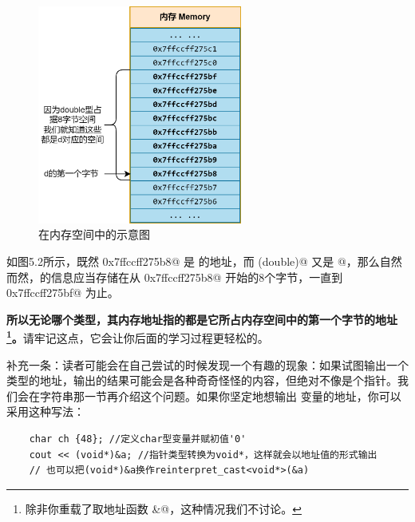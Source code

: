 \begin{figure}[htbp]
    \centering
    \includegraphics[width=0.6\textwidth]{../images/generalized_parts/05_address_of_types_in_memory.drawio.png}
    \caption{\lstinline@d@ 在内存空间中的示意图}
\end{figure}
如图5.2所示，既然 \lstinline@0x7ffccff275b8@ 是 \lstinline@d@ 的地址，而 \lstinline@sizeof(double)@ 又是 @，那么自然而然，\lstinline@d@ 的信息应当存储在从 \lstinline@0x7ffccff275b8@ 开始的8个字节，一直到 \lstinline@0x7ffccff275bf@ 为止。\par
\textbf{所以无论哪个类型，其内存地址指的都是它所占内存空间中的第一个字节的地址\footnote{除非你重载了取地址函数 \lstinline@&@，这种情况我们不讨论。}。}请牢记这点，它会让你后面的学习过程更轻松的。\par
补充一条：读者可能会在自己尝试的时候发现一个有趣的现象：如果试图输出一个 \lstinline@char@ 类型的地址，输出的结果可能会是各种奇奇怪怪的内容，但绝对不像是个指针。我们会在字符串那一节再介绍这个问题。如果你坚定地想输出 \lstinline@char@ 变量的地址，你可以采用这种写法：
\begin{lstlisting}
    char ch {48}; //定义char型变量并赋初值'0'
    cout << (void*)&a; //指针类型转换为void*，这样就会以地址值的形式输出
    // 也可以把(void*)&a换作reinterpret_cast<void*>(&a)
\end{lstlisting}
